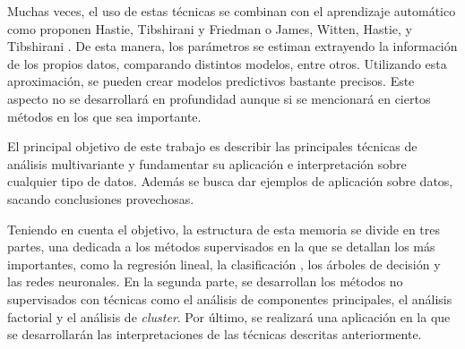 \noindent Muchas veces, el uso de estas técnicas se combinan con el aprendizaje automático como proponen Hastie, Tibshirani y Friedman \cite{Hastie 2001} o  James, Witten, Hastie, y  Tibshirani \cite{James 2013}. De esta manera, los parámetros se estiman extrayendo la información de los propios datos, comparando distintos modelos, entre otros. Utilizando esta aproximación, se pueden crear modelos predictivos bastante precisos. Este aspecto no se desarrollará en profundidad aunque si se mencionará en ciertos métodos en los que sea importante. 

\noindent El principal objetivo de este trabajo es describir las principales técnicas de análisis  multivariante y fundamentar su aplicación e interpretación sobre cualquier tipo de datos. Además se busca dar ejemplos de aplicación sobre datos, sacando conclusiones provechosas.

\noindent Teniendo en cuenta el objetivo, la estructura de esta memoria se divide en tres partes, una dedicada a los métodos supervisados en la que se detallan los más importantes, como la regresión lineal, la clasificación , los árboles de decisión  y las redes neuronales. En la segunda parte, se desarrollan los métodos no supervisados con técnicas como el análisis de componentes principales, el análisis factorial y el análisis de \emph{cluster}. Por último, se realizará una aplicación en la que se desarrollarán las interpretaciones de las técnicas descritas anteriormente. 






